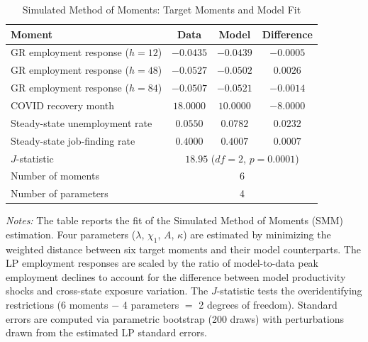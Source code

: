 \begin{table}[H]
\centering
\caption{Simulated Method of Moments: Target Moments and Model Fit}
\begin{threeparttable}
\begin{tabular}{lccc}
\toprule
Moment & Data & Model & Difference \\
\midrule
GR employment response ($h=12$) & $-0.0435$ & $-0.0439$ & $-0.0005$ \\
GR employment response ($h=48$) & $-0.0527$ & $-0.0502$ & $0.0026$ \\
GR employment response ($h=84$) & $-0.0507$ & $-0.0521$ & $-0.0014$ \\
COVID recovery month & $18.0000$ & $10.0000$ & $-8.0000$ \\
Steady-state unemployment rate & $0.0550$ & $0.0782$ & $0.0232$ \\
Steady-state job-finding rate & $0.4000$ & $0.4007$ & $0.0007$ \\
\midrule
$J$-statistic & \multicolumn{3}{c}{$18.95$ ($df=2$, $p=0.0001$)} \\
Number of moments & \multicolumn{3}{c}{6} \\
Number of parameters & \multicolumn{3}{c}{4} \\
\bottomrule
\end{tabular}
\begin{tablenotes}[flushleft]
\small
\item \textit{Notes:} The table reports the fit of the Simulated Method of Moments (SMM) estimation. Four parameters ($\lambda$, $\chi_1$, $A$, $\kappa$) are estimated by minimizing the weighted distance between six target moments and their model counterparts. The LP employment responses are scaled by the ratio of model-to-data peak employment declines to account for the difference between model productivity shocks and cross-state exposure variation. The $J$-statistic tests the overidentifying restrictions (6 moments $-$ 4 parameters $=$ 2 degrees of freedom). Standard errors are computed via parametric bootstrap (200 draws) with perturbations drawn from the estimated LP standard errors.
\end{tablenotes}
\end{threeparttable}
\label{tab:smm}
\end{table}
